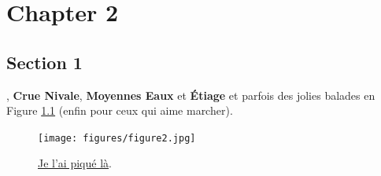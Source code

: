 \documentclass{config}
\begin{document}
\chapter{Chapter 2}
\section{Section 1}
, {\bfseries\color{LightBlue}Crue Nivale}, {\bfseries\color{Green}Moyennes Eaux} et {\bfseries\color{Red}Étiage}
et parfois des jolies balades en Figure \ref{fig:figure2} (enfin pour ceux qui aime marcher).

\begin{figure}[H]
  \centering
  \vspace{0mm}
  \texttt{[image: figures/figure2.jpg]}
  \vspace{-2mm}
  \caption{\href{https://saam.inrae.fr/}{Je l'ai piqué là}.}
  \label{fig:figure2}
  \vspace{-1mm}
\end{figure}

\lipsum[10-11] 


\printbibliography[heading=none]


\newpage
{
\thiswatermark{}
\pagestyle{empty}

}


\newpage
{
\thiswatermark{}
\pagestyle{empty}

}


\end{document}
